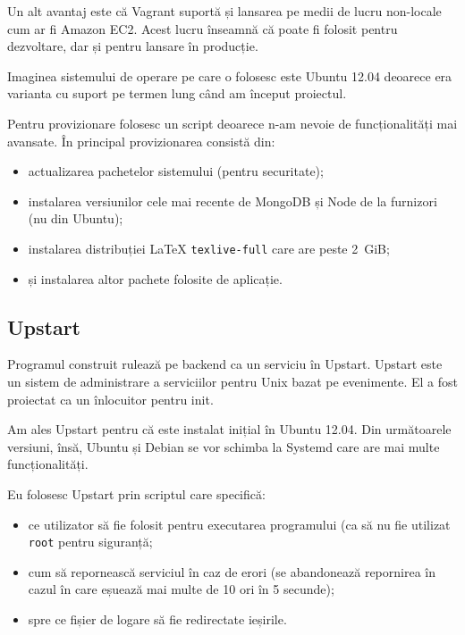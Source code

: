 \documentclass[a4wide,12pt]{report}
\newcommand{\eng}[1]{{#1}} %
\newcommand{\cod}[1]{\texttt{#1}}
\begin{document}
Un alt avantaj este că Vagrant suportă și lansarea pe medii de lucru non-locale
cum ar fi Amazon EC2. Acest lucru înseamnă că poate fi folosit pentru
dezvoltare, dar și pentru lansare în producție.

Imaginea sistemului de operare pe care o folosesc este Ubuntu 12.04 deoarece era
varianta cu suport pe termen lung când am început proiectul.

Pentru provizionare folosesc un script deoarece n-am nevoie de funcționalități
mai avansate. În principal provizionarea consistă din:

\begin{itemize}

\item actualizarea pachetelor sistemului (pentru securitate);

\item instalarea versiunilor cele mai recente de MongoDB și Node de la furnizori
(nu din Ubuntu);

\item instalarea distribuției \LaTeX{} \cod{texlive-full} care are peste 2~GiB;

\item și instalarea altor pachete folosite de aplicație.

\end{itemize}

\subsection{Upstart}

Programul construit rulează pe \eng{backend} ca un serviciu în Upstart. Upstart
este un sistem de administrare a serviciilor pentru Unix bazat pe evenimente. El
a fost proiectat ca un înlocuitor pentru init.

Am ales Upstart pentru că este instalat inițial în Ubuntu 12.04. Din următoarele
versiuni, însă, Ubuntu și Debian se vor schimba la Systemd care are mai multe
funcționalități.

Eu folosesc Upstart prin scriptul care specifică:

\begin{itemize}

\item ce utilizator să fie folosit pentru executarea programului (ca să nu fie
utilizat \cod{root} pentru siguranță;

\item cum să repornească serviciul în caz de erori (se abandonează repornirea în
cazul în care eșuează mai multe de 10 ori în 5 secunde);

\item spre ce fișier de logare să fie redirectate ieșirile.

\end{itemize}
\end{document}
